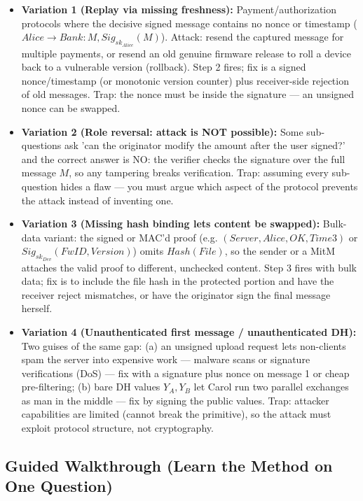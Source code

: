\documentclass[12pt, a4paper]{article}
\begin{document}
\begin{trapbox}
\begin{itemize}
    \item \textbf{Variation 1 (Replay via missing freshness):} Payment/authorization protocols where the decisive signed message contains no nonce or timestamp ($Alice \to Bank : M, Sig_{sk_{Alice}}(M)$).
    Attack: resend the captured message for multiple payments, or resend an old genuine firmware release to roll a device back to a vulnerable version (rollback).
    Step 2 fires; fix is a signed nonce/timestamp (or monotonic version counter) plus receiver-side rejection of old messages. Trap: the nonce must be inside the signature --- an unsigned nonce can be swapped.
    \item \textbf{Variation 2 (Role reversal: attack is NOT possible):} Some sub-questions ask 'can the originator modify the amount after the user signed?' and the correct answer is NO: the verifier checks the signature over the full message $M$, so any tampering breaks verification.
    Trap: assuming every sub-question hides a flaw --- you must argue which aspect of the protocol prevents the attack instead of inventing one.
    \item \textbf{Variation 3 (Missing hash binding lets content be swapped):} Bulk-data variant: the signed or MAC'd proof (e.g. $(Server, Alice, OK, Time3)$ or $Sig_{sk_{Dev}}(FwID, Version)$) omits $Hash(File)$, so the sender or a MitM attaches the valid proof to different, unchecked content.
    Step 3 fires with bulk data; fix is to include the file hash in the protected portion and have the receiver reject mismatches, or have the originator sign the final message herself.
    \item \textbf{Variation 4 (Unauthenticated first message / unauthenticated DH):} Two guises of the same gap: (a) an unsigned upload request lets non-clients spam the server into expensive work --- malware scans or signature verifications (DoS) --- fix with a signature plus nonce on message 1 or cheap pre-filtering;
    (b) bare DH values $Y_A, Y_B$ let Carol run two parallel exchanges as man in the middle --- fix by signing the public values.
    Trap: attacker capabilities are limited (cannot break the primitive), so the attack must exploit protocol structure, not cryptography.
\end{itemize}
\end{trapbox}

\subsection*{Guided Walkthrough (Learn the Method on One Question)}
\end{document}
